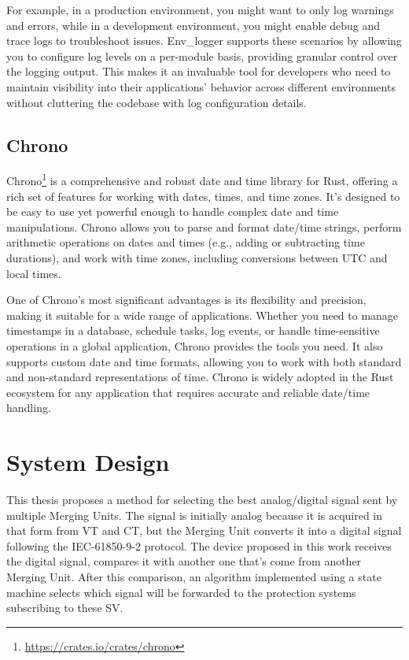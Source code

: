 For example, in a production environment, you might want to only log warnings and errors, while in a development environment, you might enable debug and trace logs to troubleshoot issues. Env\_logger supports these scenarios by allowing you to configure log levels on a per-module basis, providing granular control over the logging output. This makes it an invaluable tool for developers who need to maintain visibility into their applications’ behavior across different environments without cluttering the codebase with log configuration details.

\subsection{Chrono}

Chrono\footnote{\url{https://crates.io/crates/chrono}} is a comprehensive and robust date and time library for Rust, offering a rich set of features for working with dates, times, and time zones. It’s designed to be easy to use yet powerful enough to handle complex date and time manipulations. Chrono allows you to parse and format date/time strings, perform arithmetic operations on dates and times (e.g., adding or subtracting time durations), and work with time zones, including conversions between UTC and local times.

One of Chrono's most significant advantages is its flexibility and precision, making it suitable for a wide range of applications. Whether you need to manage timestamps in a database, schedule tasks, log events, or handle time-sensitive operations in a global application, Chrono provides the tools you need. It also supports custom date and time formats, allowing you to work with both standard and non-standard representations of time. Chrono is widely adopted in the Rust ecosystem for any application that requires accurate and reliable date/time handling.

\section{System Design}

This thesis proposes a method for selecting the best analog/digital signal sent by multiple Merging Units. The signal is initially analog because it is acquired in that form from VT and CT, but the Merging Unit converts it into a digital signal following the IEC-61850-9-2 protocol. The device proposed in this work receives the digital signal, compares it with another one that's come from another Merging Unit. After this comparison, an algorithm implemented using a state machine selects which signal will be forwarded to the protection systems subscribing to these SV.

